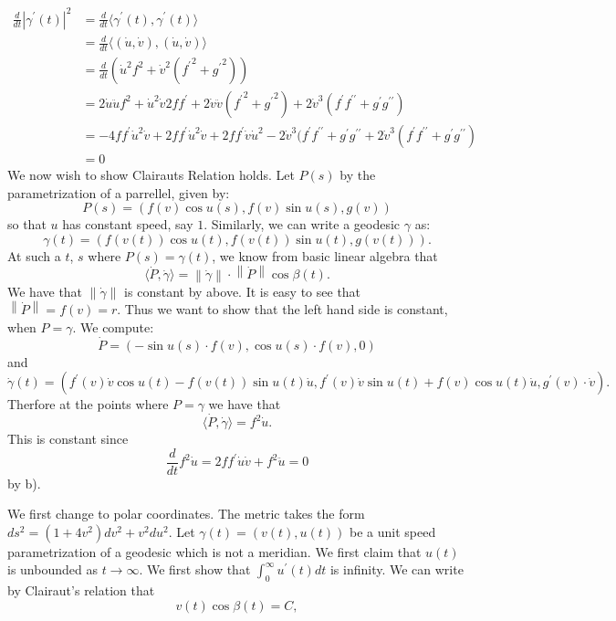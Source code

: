 \documentclass[12pt, a4paper]{article}
\theoremstyle{definition}
\newcommand{\lan}{\langle}
\newcommand{\ran}{\rangle}
\newcommand{\norm}[1]{\left\lVert#1\right\rVert}
\newcommand{\inn}[1]{\lan#1\ran}
\begin{document}
	\begin{align*}
		\frac{d}{dt}|\gamma^\prime(t)|^2 & = \frac{d}{dt} \inn{\gamma^\prime(t), \gamma^\prime(t)}
		\\ & = \frac{d}{dt}\inn{(\dot{u}, \dot{v}), (\dot{u}, \dot{v})}
		\\ & = \frac{d}{dt} \left( \dot{u}^2 f^2 + \dot{v}^2 ({f^\prime}^2  + {g^\prime}^2) 
\right)
		\\ & = 2\dot{u}\ddot{u}f^2 + \dot{u}^2 \dot{v} 2ff^\prime+ 2\dot{v} \ddot{v}({f^\prime}^2 + {g^\prime}^2) + 2\dot{v}^3 (f^\prime f^{\prime \prime} + g^\prime g^{\prime \prime})
		\\ & = -4f f^\prime \dot{u}^2\dot{v} + 2f f^\prime \dot{u}^2 \dot{v} + 2ff^\prime\dot{v}\dot{u}^2  - 2\dot{v}^3(f^\prime f^{\prime \prime }  + g^\prime g^{\prime \prime} + 2 \dot{v}^3(f^\prime f^{\prime \prime} + g^\prime g^{\prime \prime}) \tag{by b)}
	\\ & = 0
	\end{align*}
We now wish to show Clairauts Relation holds. Let $P(s)$ by the parametrization of a parrellel, given by: 
$$P(s) = \left( f(v)\cos u(s) , f(v) \sin u(s) , g(v) \right)$$ so that $u$ has constant speed, say $1$. 
Similarly, we can write a geodesic $\gamma$ as:
$$\gamma(t) = (f(v(t)) \cos u(t) , f(v(t)) \sin u(t) , g(v(t)) ).$$ At such a $t$, $s$ where $P(s) = \gamma(t)$, we know from basic linear algebra that $$\inn{\dot{P} , \dot{\gamma}} = \norm{\dot{\gamma}} \cdot \norm{\dot{P}} \cos \beta(t).$$
We have that $\norm{\dot{\gamma}}$ is constant by above. It is easy to see that $\norm{\dot{P}} = f(v)= r$. Thus we want to show that the left hand side is constant, when $P = \gamma$. 
We compute: 
$$\dot{P} =(-\sin u(s)\cdot f(v), \cos u(s) \cdot f(v), 0 ) $$
and 
$$\dot{\gamma}(t)  = \left( f^\prime (v) \dot{v} \cos u(t) - f(v(t)) \sin u(t) \dot{u},f^\prime(v) \dot{v} \sin u(t)  + f(v) \cos u(t) \dot{u}  ,  g^\prime(v) \cdot \dot{v} \right).$$
Therfore at the points where $P= \gamma$ we have that 
$$\inn{\dot{P} , \dot{\gamma}} =f^2 \dot{u}. $$ 
This is constant since $$\frac{d}{dt} f^2 \dot{u} = 2f f^\prime \dot{u}\dot{v} + f^2 \ddot{u} =0$$
by b). 
\item We first change to polar coordinates. The metric takes the form $ds^2 = (1+4v^2)dv^2 + v^2 du^2$. Let $\gamma(t) = (v(t), u(t))$ be a unit speed parametrization of a geodesic which is not a meridian. 
We first claim that $u(t)$ is unbounded as $t \to \infty$. 
We first show that $\int_0^\infty u^\prime(t) dt$ is infinity.  
We can write by Clairaut's relation that 
$$v(t) \cos \beta(t) =C,$$
\end{document}
